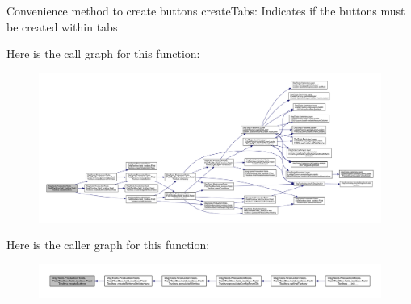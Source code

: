 \begin{DoxyVerb}Convenience method to create buttons
createTabs: Indicates if the buttons must be created within tabs
\end{DoxyVerb}
 Here is the call graph for this function\+:
\nopagebreak
\begin{figure}[H]
\begin{center}
\leavevmode
\includegraphics[width=350pt]{class_dsg_tools_1_1_production_tools_1_1_field_tool_box_1_1field__toolbox_1_1_field_toolbox_a36afd5d534e8f34243ca0fd2461e75b0_cgraph}
\end{center}
\end{figure}
Here is the caller graph for this function\+:
\nopagebreak
\begin{figure}[H]
\begin{center}
\leavevmode
\includegraphics[width=350pt]{class_dsg_tools_1_1_production_tools_1_1_field_tool_box_1_1field__toolbox_1_1_field_toolbox_a36afd5d534e8f34243ca0fd2461e75b0_icgraph}
\end{center}
\end{figure}
\mbox{\label{class_dsg_tools_1_1_production_tools_1_1_field_tool_box_1_1field__toolbox_1_1_field_toolbox_a1d76a17d90eacca8d0ad9eb0582fc43d}} 
